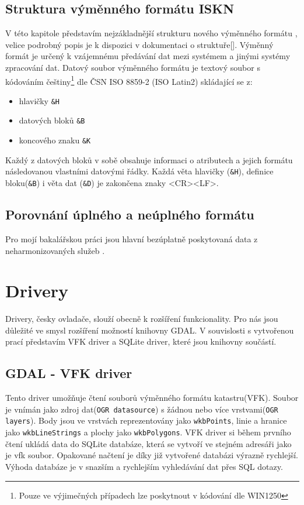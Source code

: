 \subsection{Struktura výměnného formátu ISKN}
V této kapitole představím nejzákladnější strukturu nového výměnného formátu , velice podrobný popis je k dispozici v dokumentaci o struktuře[]. Výměnný formát je určený k vzájemnému předávání dat mezi systémem  a jinými systémy zpracování dat. Datový soubor výměnného formátu je textový soubor s kódováním češtiny\footnote{Pouze ve výjimečných případech lze poskytnout v kódování dle WIN1250} dle ČSN ISO 8859-2 (ISO Latin2) skládající se z:
\begin{itemize}
		\item hlavičky \verb|&H|
		\item datových bloků \verb|&B|
		\item koncového znaku \verb|&K|
\end{itemize}
Každý z datových bloků v sobě obsahuje informaci o atributech a jejich formátu následovanou vlastními datovými řádky. Každá věta hlavičky (\verb|&H|), definice bloku(\verb|&B|) i věta dat (\verb|&D|) je zakončena znaky <CR><LF>. %
\subsection{Porovnání úplného a neúplného formátu}
Pro mojí bakalářskou práci jsou hlavní bezúplatně poskytovaná data z neharmonizovaných služeb .

\section{Drivery} 
Drivery, česky ovladače, slouží obecně k rozšíření funkcionality. Pro nás jsou důležité ve smysl rozšíření možností knihovny GDAL. V souvislosti s vytvořenou prací představím VFK driver a SQLite driver, které jsou knihovny  součástí.
\subsection{GDAL - VFK driver}
Tento driver umožňuje čtení souborů výměnného formátu katastru(VFK). Soubor  je vnímán jako zdroj dat(\verb|OGR datasource|) s žádnou nebo více vrstvami(\verb|OGR layers|). Body jsou ve vrstvách reprezentovány jako \verb|wkbPoints|, linie a hranice jako \verb|wkbLineStrings| a plochy jako \verb|wkbPolygons|. VFK driver si během prvního čtení ukládá data do SQLite databáze, která se vytvoří ve stejném adresáři jako je vfk soubor. Opakované načtení je díky již vytvořené databázi výrazně rychlejší. Výhoda databáze je v snazším a rychlejším vyhledávání dat přes SQL dotazy.
